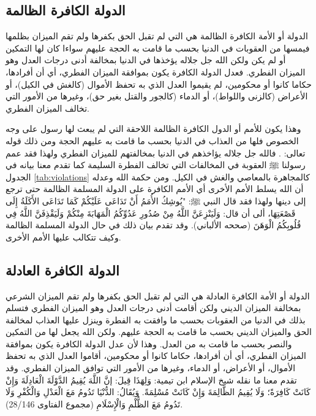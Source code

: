 \subsection{الدولة الكافرة الظالمة}

الدولة أو الأمة الكافرة الظالمة هي التي لم تقبل الحق بكفرها ولم تقم الميزان بظلمها فيمسها من العقوبات في الدنيا بحسب ما قامت به الحجة عليهم سواءا كان لها التمكين أو لم يكن ولكن الله جل جلاله يؤخذها في الدنيا بمخالفة أدنى درجات العدل وهو الميزان الفطري. فعدل الدولة الكافرة يكون بموافقة الميزان الفطري، أي أن أفرادها، حكاما كانوا أو محكومين، لم يقيموا العدل الذي به تحفظ الأموال (كالغش في الكيل)، أو الأعراض (كالزنى واللواط)، أو الدماء (كالجور والقتل بغير حق)، وغيرها من الأمور التي تخالف الميزان الفطري. 

وهذا يكون للأمم أو الدول الكافرة الظالمة اللاحقة التي لم يبعث لها رسول على وجه الخصوص فلها من العذاب في الدنيا بحسب ما قامت به عليهم الحجة ومن ذلك قوله تعالى: 
\quranayah*[17][15]{\footnotesize \surahname*[17]}. فالله جل جلاله يؤاخذهم في الدنيا بمخالفتهم للميزان الفطري ولهذا فقد عمم رسولنا ﷺ العقوبة في المخالفات التي تخالف الفطرة السليمة كما تقدم معنا بيانه في الجدول \ref{tab:violations} كالمجاهرة بالمعاصي والغش في الكيل. ومن حكمة الله وعدله أن الله يسلط الأمم الأخرى أي الأمم الكافرة على الدولة المسلمة الظالمة حتى ترجع إلى دينها ولهذا فقد قال النبي ﷺ: "يُوشِكُ الأُمَمُ أَنْ تَدَاعَى عَلَيْكُمْ كَمَا تَدَاعَى الأَكَلَةُ إِلَى قَصْعَتِهَا، ألى أن قال: وَلَيَنْزِعَنَّ اللَّهُ مِنْ صُدُورِ عَدُوِّكُمُ الْمَهَابَةَ مِنْكُمْ وَلَيَقْذِفَنَّ اللَّهُ فِي قُلُوبِكُمُ الْوَهَنَ {\footnotesize (صححه الألباني)}. وقد تقدم بيان ذلك في حال الدولة المسلمة الظالمة وكيف تتكالب عليها الأمم الأخرى.

\subsection{الدولة الكافرة العادلة}

الدولة أو الأمة الكافرة العادلة هي التي لم تقبل الحق بكفرها ولم تقم الميزان الشرعي بمخالفة الميزان الديني ولكن أقامت أدنى درجات العدل وهو الميزان الفطري فتسلم بذلك في الدنيا من العقوبات بحسب ما وافقت به الفطرة وينزل عليها العذاب لمخالفة الحق والميزان الديني بحسب ما قامت به الحجة عليهم. ولكن الله يجعل لها من التمكين والنصر بحسب ما قامت به من العدل. وهذا لأن عدل الدولة الكافرة يكون بموافقة الميزان الفطري، أي أن أفرادها، حكاما كانوا أو محكومين، أقاموا العدل الذي به تحفظ الأموال، أو الأعراض، أو الدماء، وغيرها من الأمور التي توافق الميزان الفطري. وقد تقدم معنا ما نقله شيخ الإسلام ابن تيمية: وَلِهَذَا قِيلَ: إنَّ اللَّهَ يُقِيمُ الدَّوْلَةَ الْعَادِلَةَ وَإِنْ كَانَتْ كَافِرَةً؛ وَلَا يُقِيمُ الظَّالِمَةَ وَإِنْ كَانَتْ مُسْلِمَةً. وَيُقَالُ: الدُّنْيَا تَدُومُ مَعَ الْعَدْلِ وَالْكُفْرِ وَلَا تَدُومُ مَعَ الظُّلْمِ وَالْإِسْلَامِ {\footnotesize (مجموع الفتاوى 28/146)}.

